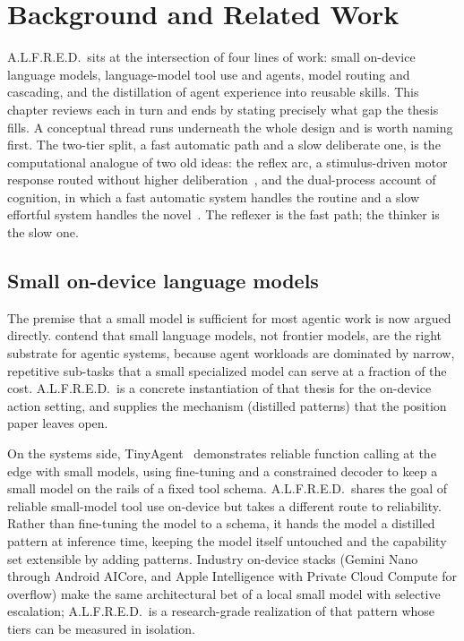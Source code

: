 \chapter{Background and Related Work}
\label{ch:background}

A.L.F.R.E.D.\ sits at the intersection of four lines of work: small on-device
language models, language-model tool use and agents, model routing and cascading,
and the distillation of agent experience into reusable skills. This chapter
reviews each in turn and ends by stating precisely what gap the thesis fills. A
conceptual thread runs underneath the whole design and is worth naming first. The
two-tier split, a fast automatic path and a slow deliberate one, is the
computational analogue of two old ideas: the reflex arc, a stimulus-driven motor
response routed without higher deliberation~\citep{sherrington1906}, and the
dual-process account of cognition, in which a fast automatic system handles the
routine and a slow effortful system handles the novel~\citep{kahneman2011}. The
reflexer is the fast path; the thinker is the slow one.

\section{Small on-device language models}
\label{sec:bg-slm}

The premise that a small model is sufficient for most agentic work is now argued
directly. \citet{belcak2025slm} contend that small language models, not frontier
models, are the right substrate for agentic systems, because agent workloads are
dominated by narrow, repetitive sub-tasks that a small specialized model can serve
at a fraction of the cost. A.L.F.R.E.D.\ is a concrete instantiation of that
thesis for the on-device action setting, and supplies the mechanism (distilled
patterns) that the position paper leaves open.

On the systems side, TinyAgent~\citep{erdogan2024tinyagent} demonstrates reliable
function calling at the edge with small models, using fine-tuning and a
constrained decoder to keep a small model on the rails of a fixed tool schema.
A.L.F.R.E.D.\ shares the goal of reliable small-model tool use on-device but takes
a different route to reliability. Rather than fine-tuning the model to a schema,
it hands the model a distilled pattern at inference time, keeping the model itself
untouched and the capability set extensible by adding patterns. Industry on-device
stacks (Gemini Nano through Android AICore, and Apple Intelligence with Private
Cloud Compute for overflow) make the same architectural bet of a local small model
with selective escalation; A.L.F.R.E.D.\ is a research-grade realization of that
pattern whose tiers can be measured in isolation.

